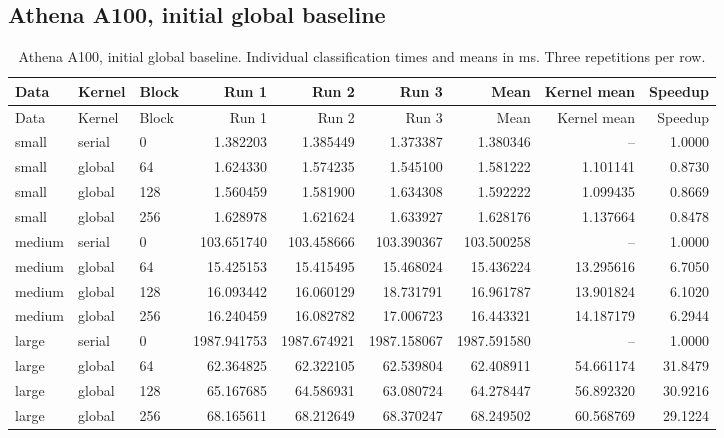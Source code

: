 \subsection{Athena A100, initial global baseline}
\small
\begin{longtable}{lllrrrrrr}
\caption{Athena A100, initial global baseline. Individual classification times and means in ms. Three repetitions per row.}\\
\toprule
Data & Kernel & Block & Run 1 & Run 2 & Run 3 & Mean & Kernel mean & Speedup \\
\midrule\endfirsthead
\toprule
Data & Kernel & Block & Run 1 & Run 2 & Run 3 & Mean & Kernel mean & Speedup \\
\midrule\endhead
\bottomrule\endfoot
small & serial & 0 & 1.382203 & 1.385449 & 1.373387 & 1.380346 & -- & 1.0000 \\
small & global & 64 & 1.624330 & 1.574235 & 1.545100 & 1.581222 & 1.101141 & 0.8730 \\
small & global & 128 & 1.560459 & 1.581900 & 1.634308 & 1.592222 & 1.099435 & 0.8669 \\
small & global & 256 & 1.628978 & 1.621624 & 1.633927 & 1.628176 & 1.137664 & 0.8478 \\
medium & serial & 0 & 103.651740 & 103.458666 & 103.390367 & 103.500258 & -- & 1.0000 \\
medium & global & 64 & 15.425153 & 15.415495 & 15.468024 & 15.436224 & 13.295616 & 6.7050 \\
medium & global & 128 & 16.093442 & 16.060129 & 18.731791 & 16.961787 & 13.901824 & 6.1020 \\
medium & global & 256 & 16.240459 & 16.082782 & 17.006723 & 16.443321 & 14.187179 & 6.2944 \\
large & serial & 0 & 1987.941753 & 1987.674921 & 1987.158067 & 1987.591580 & -- & 1.0000 \\
large & global & 64 & 62.364825 & 62.322105 & 62.539804 & 62.408911 & 54.661174 & 31.8479 \\
large & global & 128 & 65.167685 & 64.586931 & 63.080724 & 64.278447 & 56.892320 & 30.9216 \\
large & global & 256 & 68.165611 & 68.212649 & 68.370247 & 68.249502 & 60.568769 & 29.1224 \\
\end{longtable}\normalsize
